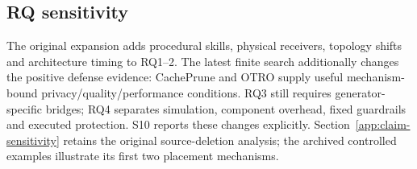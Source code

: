 \subsection{RQ sensitivity}\label{app:rq-sensitivity}
The original expansion adds procedural skills, physical receivers, topology shifts and architecture timing to RQ1--2. The latest finite search additionally changes the positive defense evidence: CachePrune and OTRO supply useful mechanism-bound privacy/quality/performance conditions. RQ3 still requires generator-specific bridges; RQ4 separates simulation, component overhead, fixed guardrails and executed protection. S10 reports these changes explicitly. Section~\ref{app:claim-sensitivity} retains the original source-deletion analysis; the archived controlled examples illustrate its first two placement mechanisms.
